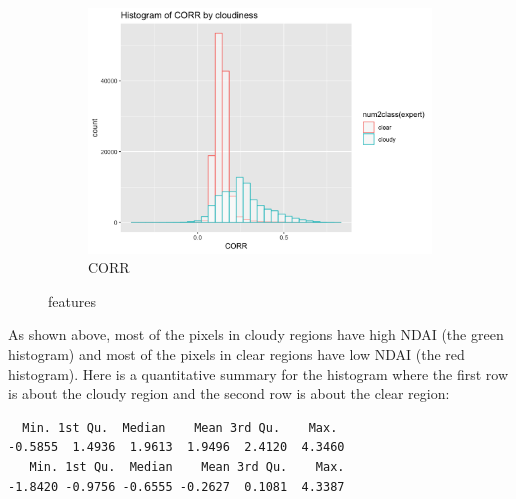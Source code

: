 \documentclass[jou]{apa}%
\begin{document}
\begin{figure}[H]
\begin{subfigure}{0.4\columnwidth}
    \includegraphics[scale=.1]{CORR}
    \caption{CORR}
    \label{fig:2}
  \end{subfigure}
 \caption{features}
\end{figure}


As shown above, most of the pixels in cloudy regions have high NDAI (the green histogram) and most of the pixels in clear regions have low NDAI (the red histogram). Here is a quantitative summary for the histogram where the first row is about the cloudy region and the second row is about the clear region:
\begin{verbatim}
  Min. 1st Qu.  Median    Mean 3rd Qu.    Max. 
-0.5855  1.4936  1.9613  1.9496  2.4120  4.3460 
   Min. 1st Qu.  Median    Mean 3rd Qu.    Max. 
-1.8420 -0.9756 -0.6555 -0.2627  0.1081  4.3387 
\end{verbatim}
\end{document}
